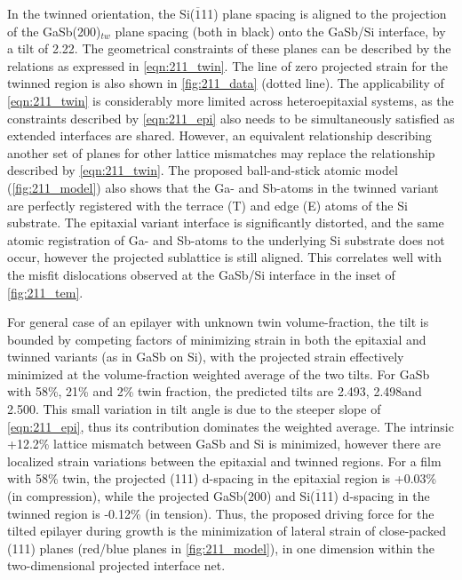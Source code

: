 In the twinned orientation, the Si($\overline{1}$11) plane spacing is aligned to the projection of the GaSb(200)$_{tw}$ plane spacing (both in black) onto the GaSb/Si interface, by a tilt of 2.22\degree. The geometrical constraints of these planes can be described by the relations as expressed in \cref{eqn:211_twin}. The line of zero projected strain for the twinned region is also shown in \cref{fig:211_data} (dotted line). The applicability of \cref{eqn:211_twin} is considerably more limited across heteroepitaxial systems, as the constraints described by \cref{eqn:211_epi} also needs to be simultaneously satisfied as extended interfaces are shared. However, an equivalent relationship describing another set of planes for other lattice mismatches may replace the relationship described by \cref{eqn:211_twin}. The proposed ball-and-stick atomic model (\cref{fig:211_model}) also shows that the Ga- and Sb-atoms in the twinned variant are perfectly registered with the terrace (T) and edge (E) atoms of the Si substrate. The epitaxial variant interface is significantly distorted, and the same atomic registration of Ga- and Sb-atoms to the underlying Si substrate does not occur, however the projected sublattice is still aligned. This correlates well with the misfit dislocations observed at the GaSb/Si interface in the inset of \cref{fig:211_tem}.

For general case of an epilayer with unknown twin volume-fraction, the tilt is bounded by competing factors of minimizing strain in both the epitaxial and twinned variants (as in GaSb on Si), with the projected strain effectively minimized at the volume-fraction weighted average of the two tilts. For GaSb with 58\%, 21\% and 2\% twin fraction, the predicted tilts are 2.493\degree, 2.498\degree and 2.500\degree. This small variation in tilt angle is due to the steeper slope of \cref{eqn:211_epi}, thus its contribution dominates the weighted average. The intrinsic +12.2\% lattice mismatch between GaSb and Si is minimized, however there are localized strain variations between the epitaxial and twinned regions. For a film with 58\% twin, the projected (111) d-spacing in the epitaxial region is +0.03\% (in compression), while the projected GaSb(200) and Si($\overline{1}$11) d-spacing in the twinned region is -0.12\% (in tension). Thus, the proposed driving force for the tilted epilayer during growth is the minimization of lateral strain of close-packed (111) planes (red/blue planes in \cref{fig:211_model}), in one dimension within the two-dimensional projected interface net.

